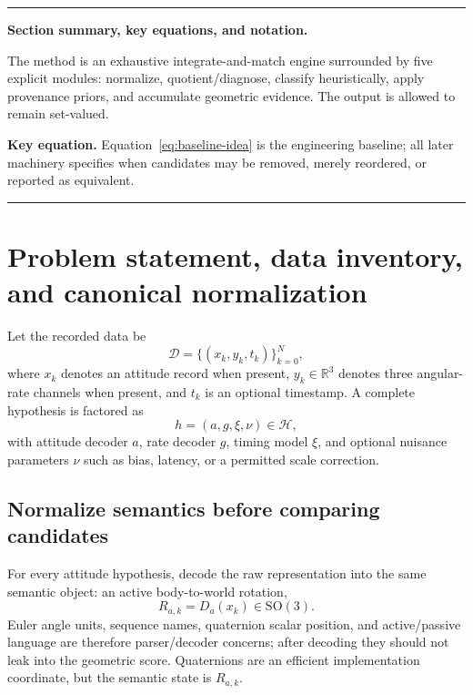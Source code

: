 \documentclass[11pt]{article}
\newcommand{\SO}{\mathrm{SO}(3)}
\newenvironment{sectionrecap}
{\par\medskip\begingroup\small\noindent\rule{\linewidth}{0.4pt}\par
\smallskip\noindent\textbf{Section summary, key equations, and notation.}\par\smallskip}
{\par\smallskip\noindent\rule{\linewidth}{0.4pt}\par\endgroup\medskip}
\begin{document}
    \begin{sectionrecap}
        The method is an exhaustive integrate-and-match engine surrounded by five explicit
        modules: normalize, quotient/diagnose, classify heuristically, apply provenance priors,
        and accumulate geometric evidence. The output is allowed to remain set-valued.

        \noindent\textbf{Key equation.}
        Equation~\eqref{eq:baseline-idea} is the engineering baseline; all later machinery
        specifies when candidates may be removed, merely reordered, or reported as equivalent.
    \end{sectionrecap}


    \section{Problem statement, data inventory, and canonical normalization}
    \label{sec:problem}

    Let the recorded data be
    \begin{equation}
        \mathcal D=\{(x_k,y_k,t_k)\}_{k=0}^{N},
        \label{eq:data-record}
    \end{equation}
    where $x_k$ denotes an attitude record when present, $y_k\in\mathbb R^3$ denotes three
    angular-rate channels when present, and $t_k$ is an optional timestamp. A complete
    hypothesis is factored as
    \begin{equation}
        h=(a,g,\xi,\nu)\in\mathcal H,
        \label{eq:focused-hypothesis}
    \end{equation}
    with attitude decoder $a$, rate decoder $g$, timing model $\xi$, and optional nuisance
    parameters $\nu$ such as bias, latency, or a permitted scale correction.

    \subsection{Normalize semantics before comparing candidates}

    For every attitude hypothesis, decode the raw representation into the same semantic
    object: an active body-to-world rotation,
    \begin{equation}
        R_{a,k}=D_a(x_k)\in\SO.
        \label{eq:canonical-attitude}
    \end{equation}
    Euler angle units, sequence names, quaternion scalar position, and active/passive language
    are therefore parser/decoder concerns; after decoding they should not leak into the
    geometric score. Quaternions are an efficient implementation coordinate, but the
    semantic state is $R_{a,k}$.
\end{document}
